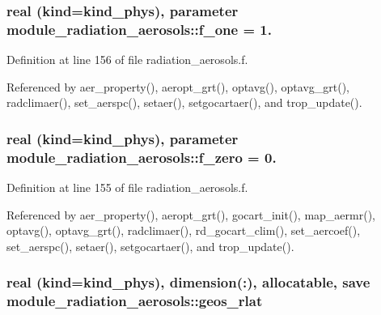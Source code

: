 \subsubsection[{\texorpdfstring{f\+\_\+one}{f_one}}]{\setlength{\rightskip}{0pt plus 5cm}real (kind=kind\+\_\+phys), parameter module\+\_\+radiation\+\_\+aerosols\+::f\+\_\+one = 1.\hspace{0.3cm}{\ttfamily [private]}}\hypertarget{namespacemodule__radiation__aerosols_a63babe7f9ec4ff6a0364993f4be3768e}{}\label{namespacemodule__radiation__aerosols_a63babe7f9ec4ff6a0364993f4be3768e}


Definition at line 156 of file radiation\+\_\+aerosols.\+f.



Referenced by aer\+\_\+property(), aeropt\+\_\+grt(), optavg(), optavg\+\_\+grt(), radclimaer(), set\+\_\+aerspc(), setaer(), setgocartaer(), and trop\+\_\+update().

\subsubsection[{\texorpdfstring{f\+\_\+zero}{f_zero}}]{\setlength{\rightskip}{0pt plus 5cm}real (kind=kind\+\_\+phys), parameter module\+\_\+radiation\+\_\+aerosols\+::f\+\_\+zero = 0.\hspace{0.3cm}{\ttfamily [private]}}\hypertarget{namespacemodule__radiation__aerosols_a7db1adcf476a9a5532230aa11fcc3bb7}{}\label{namespacemodule__radiation__aerosols_a7db1adcf476a9a5532230aa11fcc3bb7}


Definition at line 155 of file radiation\+\_\+aerosols.\+f.



Referenced by aer\+\_\+property(), aeropt\+\_\+grt(), gocart\+\_\+init(), map\+\_\+aermr(), optavg(), optavg\+\_\+grt(), radclimaer(), rd\+\_\+gocart\+\_\+clim(), set\+\_\+aercoef(), set\+\_\+aerspc(), setaer(), setgocartaer(), and trop\+\_\+update().

\subsubsection[{\texorpdfstring{geos\+\_\+rlat}{geos_rlat}}]{\setlength{\rightskip}{0pt plus 5cm}real (kind=kind\+\_\+phys), dimension(\+:), allocatable, save module\+\_\+radiation\+\_\+aerosols\+::geos\+\_\+rlat\hspace{0.3cm}{\ttfamily [private]}}\hypertarget{namespacemodule__radiation__aerosols_aef43bfbd28ef9b87e8d6973ba7331a18}{}\label{namespacemodule__radiation__aerosols_aef43bfbd28ef9b87e8d6973ba7331a18}


